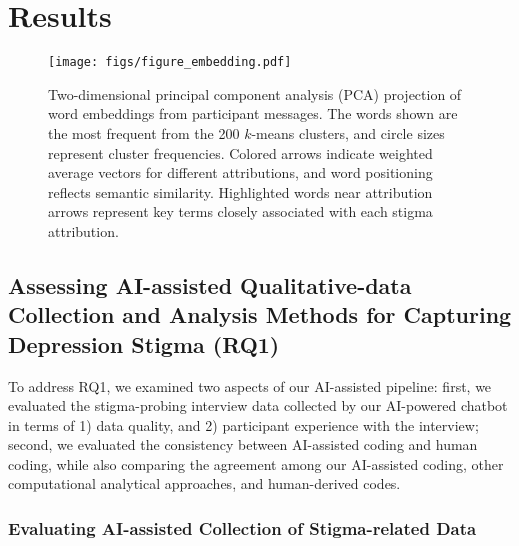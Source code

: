 \section{Results}

\begin{figure*}
    \centering
    \texttt{[image: figs/figure\_embedding.pdf]}
    \caption{Two-dimensional principal component analysis (PCA) projection of word embeddings from participant messages. The words shown are the most frequent from the 200 $k$-means clusters, and circle sizes represent cluster frequencies. Colored arrows indicate weighted average vectors for different attributions, and word positioning reflects semantic similarity. Highlighted words near attribution arrows represent key terms closely associated with each stigma attribution.}
    \label{fig:datacollection}
\end{figure*}

\subsection{Assessing AI-assisted Qualitative-data Collection and Analysis Methods for Capturing Depression Stigma (RQ1)}

To address RQ1, we examined two aspects of our AI-assisted pipeline: first, we evaluated the stigma-probing interview data collected by our AI-powered chatbot in terms of 1) data quality, and 2) participant experience with the interview; second, we evaluated the consistency between AI-assisted coding and human coding, while also comparing the agreement among our AI-assisted coding, other computational analytical approaches, and human-derived codes.

\subsubsection{Evaluating AI-assisted Collection of Stigma-related Data}



